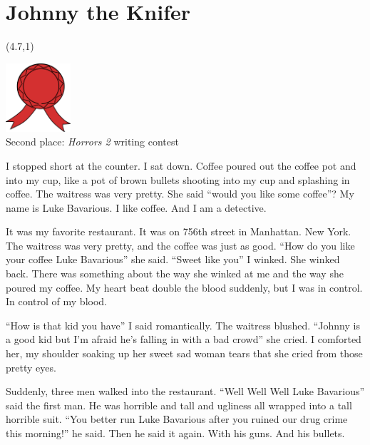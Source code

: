 \chapter{Johnny the Knifer}

\begin{textblock}{1.5}(4.7,1)
\begin{center}
\includegraphics[height=1in]{art/red-ribbon.pdf} \\
{\scriptsize Second place: {\em Horrors 2} writing contest}
\end{center}
\end{textblock}

\noindent I stopped short at the counter. I sat down. Coffee poured out the
coffee pot and into my cup, like a pot of brown bullets shooting
into my cup and splashing in coffee. The waitress was very pretty.
She said ``would you like some coffee''? My name is Luke Bavarious. I
like coffee. And I am a detective.



It was my favorite restaurant. It was on 756th street in Manhattan.
New York. The waitress was very pretty, and the coffee was just as
good. ``How do you like your coffee Luke Bavarious'' she said. ``Sweet
like you'' I winked. She winked back. There was something about the
way she winked at me and the way she poured my coffee. My heart
beat double the blood suddenly, but I was in control. In control of
my blood.



``How is that kid you have'' I said romantically. The waitress
blushed. ``Johnny is a good kid but I'm afraid he's falling in with
a bad crowd'' she cried. I comforted her, my shoulder soaking up her
sweet sad woman tears that she cried from those pretty eyes.



Suddenly, three men walked into the restaurant. ``Well Well Well
Luke Bavarious'' said the first man. He was horrible and tall and
ugliness all wrapped into a tall horrible suit. ``You better run
Luke Bavarious after you ruined our drug crime this morning!'' he
said. Then he said it again. With his guns. And his bullets.



